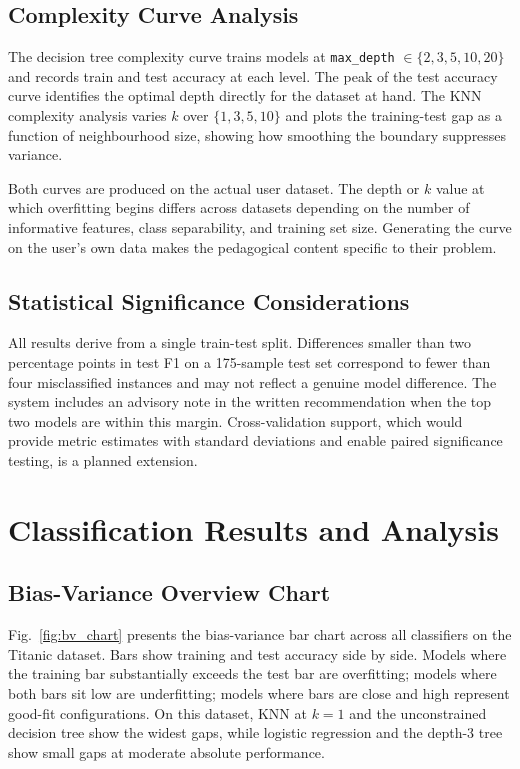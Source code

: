 \documentclass[conference]{IEEEtran}
\begin{document}
\subsection{Complexity Curve Analysis}

The decision tree complexity curve trains models at \texttt{max\_depth} $\in \{2, 3, 5, 10, 20\}$ and records train and test accuracy at each level. The peak of the test accuracy curve identifies the optimal depth directly for the dataset at hand. The KNN complexity analysis varies $k$ over $\{1, 3, 5, 10\}$ and plots the training-test gap as a function of neighbourhood size, showing how smoothing the boundary suppresses variance.

Both curves are produced on the actual user dataset. The depth or $k$ value at which overfitting begins differs across datasets depending on the number of informative features, class separability, and training set size. Generating the curve on the user's own data makes the pedagogical content specific to their problem.

\subsection{Statistical Significance Considerations}

All results derive from a single train-test split. Differences smaller than two percentage points in test F1 on a 175-sample test set correspond to fewer than four misclassified instances and may not reflect a genuine model difference. The system includes an advisory note in the written recommendation when the top two models are within this margin. Cross-validation support, which would provide metric estimates with standard deviations and enable paired significance testing, is a planned extension.

\section{Classification Results and Analysis}

\subsection{Bias-Variance Overview Chart}

Fig.~\ref{fig:bv_chart} presents the bias-variance bar chart across all classifiers on the Titanic dataset. Bars show training and test accuracy side by side. Models where the training bar substantially exceeds the test bar are overfitting; models where both bars sit low are underfitting; models where bars are close and high represent good-fit configurations. On this dataset, KNN at $k=1$ and the unconstrained decision tree show the widest gaps, while logistic regression and the depth-3 tree show small gaps at moderate absolute performance.
\end{document}
